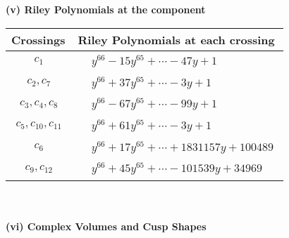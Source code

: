 \documentclass[1p]{elsarticle_modified}
\theoremstyle{definition}
\begin{document}
\newpage\renewcommand{\arraystretch}{1}
\flushleft \textbf{(v) Riley Polynomials at the component}\newline \\
\begin{tabular}{m{50pt}|m{274pt}}
Crossings & \hspace{64pt}Riley Polynomials at each crossing \\
\hline $$\begin{aligned}c_{1}\end{aligned}$$&$\begin{aligned}
&y^{66}-15 y^{65}+\cdots-47 y+1
\end{aligned}$\\
\hline $$\begin{aligned}c_{2},c_{7}\end{aligned}$$&$\begin{aligned}
&y^{66}+37 y^{65}+\cdots-3 y+1
\end{aligned}$\\
\hline $$\begin{aligned}c_{3},c_{4},c_{8}\end{aligned}$$&$\begin{aligned}
&y^{66}-67 y^{65}+\cdots-99 y+1
\end{aligned}$\\
\hline $$\begin{aligned}c_{5},c_{10},c_{11}\end{aligned}$$&$\begin{aligned}
&y^{66}+61 y^{65}+\cdots-3 y+1
\end{aligned}$\\
\hline $$\begin{aligned}c_{6}\end{aligned}$$&$\begin{aligned}
&y^{66}+17 y^{65}+\cdots+1831157 y+100489
\end{aligned}$\\
\hline $$\begin{aligned}c_{9},c_{12}\end{aligned}$$&$\begin{aligned}
&y^{66}+45 y^{65}+\cdots-101539 y+34969
\end{aligned}$\\
\hline
\end{tabular}\\~\\
\newpage\flushleft \textbf{(vi) Complex Volumes and Cusp Shapes}
\end{document}
